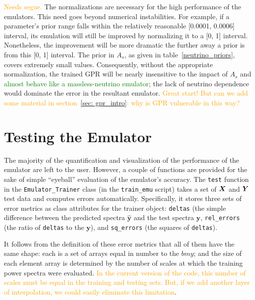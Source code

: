 
\textcolor{orange}{Needs segue.}
The normalizations are necessary for the high performance of the emulators. 
This need goes beyond numerical instabilities. For example, if a parameter's 
prior range falls within the relatively reasonable [0.0001, 0.0006] interval, 
its emulation will still be improved by normalizing it to a [0, 1] interval. 
Nonetheless, the improvement will be more dramatic the further away a prior is 
from this [0, 1] interval. The prior in $A_s$, as given in
table~\ref{neutrino_priors}, covers extremely small values. Consequently, 
without the appropriate normalization, the trained GPR will be nearly 
insensitive to the impact of $A_s$ and \textcolor{green}{almost behave like a 
massless-neutrino emulator}; the lack of neutrino dependence would dominate 
the error in the resultant emulator.
\textcolor{orange}{Great start! But can we add some material in
section~\ref{sec: gpr_intro}: why is GPR vulnerable in this way?}

\section{Testing the Emulator}
\label{test_emu}

The majority of the quantification and visualization of the performance of the
emulator are left to the user. However, a couple of functions are provided for 
the sake of simple ``eyeball'' evaluation of the emulator's accuracy.
The \verb|test| function in the \verb|Emulator_Trainer| class (in the
\verb|train_emu| script) takes a set of $\bm{X}$ and $\bm{Y}$ test data 
and computes errors automatically. Specifically, it stores three sets of error 
metrics as class attributes for the trainer object: \verb|deltas| (the simple 
difference between the predicted spectra $\hat{\bm{y}}$ and the test spectra
$\bm{y}$, \verb|rel_errors| (the ratio of \verb|deltas| to the $\bm{y}$), and
\verb|sq_errors| (the squares of \verb|deltas|).

It follows from the definition of these error metrics that all of them have 
the same shape: each is a set of arrays equal in number to the $bm{y}$; and 
the size of each element array is determined by the number of scales at which 
the training power spectra were evaluated. \textcolor{orange}{In the current
version of the code, this number of scales must be equal in the training and
testing sets. But, if we add another layer of interpolation, we could easily
eliminate this limitation}.

